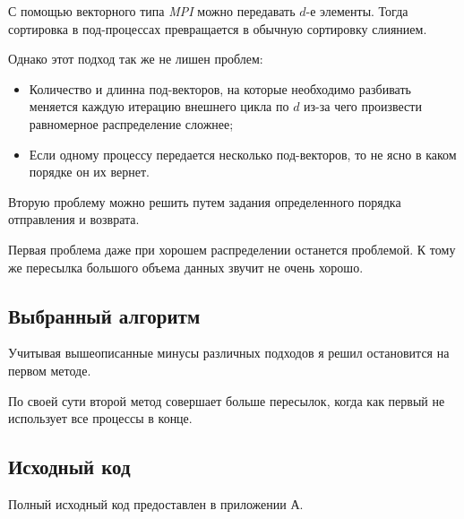 С помощью векторного типа \textit{MPI} можно передавать $d$-е элементы.
Тогда сортировка в под-процессах превращается в обычную сортировку слиянием.

Однако этот подход так же не лишен проблем:
\begin{itemize}
    \item Количество и длинна под-векторов, на которые необходимо разбивать меняется каждую итерацию внешнего цикла по $d$ из-за чего произвести равномерное распределение сложнее;
    \item Если одному процессу передается несколько под-векторов, то не ясно в каком порядке он их вернет.
\end{itemize}

Вторую проблему можно решить путем задания определенного порядка отправления и возврата.

Первая проблема даже при хорошем распределении останется проблемой.
К тому же пересылка большого объема данных звучит не очень хорошо.

\subsection{Выбранный алгоритм}

Учитывая вышеописанные минусы различных подходов я решил остановится на первом методе.

По своей сути второй метод совершает больше пересылок, когда как первый не использует все процессы в конце.

\subsection{Исходный код}

Полный исходный код предоставлен в приложении А.